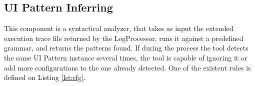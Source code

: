 \documentclass[conference]{IEEEtran}
\begin{document}
\begin{table}[!htb]
\caption{Example of an execution trace file, and of processed lines.}
\label{tab:exec}
\end{table}

\subsection{UI Pattern Inferring}\label{sec:inf}
This component is a syntactical analyzer, that takes as input the extended execution trace file returned by the LogProcessor, runs it against a predefined grammar, and returns the patterns found. If during the process the tool detects the same UI Pattern instance several times, the tool is capable of ignoring it or add more configurations to the one already detected. One of the existent rules is defined on Listing \ref{lst:cfg}.

\end{document}
